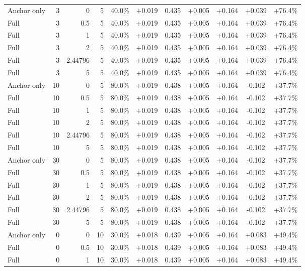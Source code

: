 \begin{table}[htbp]
\begin{tabular}{lrrrccccccc}
Anchor only & 3 & 0 & 5 & 40.0\% & +0.019 & 0.435 & +0.005 & +0.164 & +0.039 & +76.4\% \\
Full & 3 & 0.5 & 5 & 40.0\% & +0.019 & 0.435 & +0.005 & +0.164 & +0.039 & +76.4\% \\
Full & 3 & 1 & 5 & 40.0\% & +0.019 & 0.435 & +0.005 & +0.164 & +0.039 & +76.4\% \\
Full & 3 & 2 & 5 & 40.0\% & +0.019 & 0.435 & +0.005 & +0.164 & +0.039 & +76.4\% \\
Full & 3 & 2.44796 & 5 & 40.0\% & +0.019 & 0.435 & +0.005 & +0.164 & +0.039 & +76.4\% \\
Full & 3 & 5 & 5 & 40.0\% & +0.019 & 0.435 & +0.005 & +0.164 & +0.039 & +76.4\% \\
Anchor only & 10 & 0 & 5 & 80.0\% & +0.019 & 0.438 & +0.005 & +0.164 & -0.102 & +37.7\% \\
Full & 10 & 0.5 & 5 & 80.0\% & +0.019 & 0.438 & +0.005 & +0.164 & -0.102 & +37.7\% \\
Full & 10 & 1 & 5 & 80.0\% & +0.019 & 0.438 & +0.005 & +0.164 & -0.102 & +37.7\% \\
Full & 10 & 2 & 5 & 80.0\% & +0.019 & 0.438 & +0.005 & +0.164 & -0.102 & +37.7\% \\
Full & 10 & 2.44796 & 5 & 80.0\% & +0.019 & 0.438 & +0.005 & +0.164 & -0.102 & +37.7\% \\
Full & 10 & 5 & 5 & 80.0\% & +0.019 & 0.438 & +0.005 & +0.164 & -0.102 & +37.7\% \\
Anchor only & 30 & 0 & 5 & 80.0\% & +0.019 & 0.438 & +0.005 & +0.164 & -0.102 & +37.7\% \\
Full & 30 & 0.5 & 5 & 80.0\% & +0.019 & 0.438 & +0.005 & +0.164 & -0.102 & +37.7\% \\
Full & 30 & 1 & 5 & 80.0\% & +0.019 & 0.438 & +0.005 & +0.164 & -0.102 & +37.7\% \\
Full & 30 & 2 & 5 & 80.0\% & +0.019 & 0.438 & +0.005 & +0.164 & -0.102 & +37.7\% \\
Full & 30 & 2.44796 & 5 & 80.0\% & +0.019 & 0.438 & +0.005 & +0.164 & -0.102 & +37.7\% \\
Full & 30 & 5 & 5 & 80.0\% & +0.019 & 0.438 & +0.005 & +0.164 & -0.102 & +37.7\% \\
Anchor only & 0 & 0 & 10 & 30.0\% & +0.018 & 0.439 & +0.005 & +0.164 & +0.083 & +49.4\% \\
Full & 0 & 0.5 & 10 & 30.0\% & +0.018 & 0.439 & +0.005 & +0.164 & +0.083 & +49.4\% \\
Full & 0 & 1 & 10 & 30.0\% & +0.018 & 0.439 & +0.005 & +0.164 & +0.083 & +49.4\% \\

\end{tabular}
\end{table}
